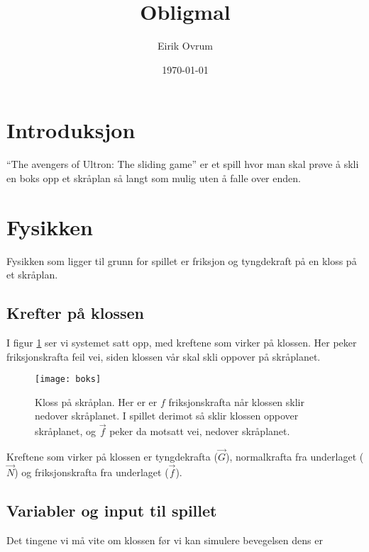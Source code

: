 \documentclass[letterpaper,12pt]{article}
\begin{document}
\title{Obligmal}
\author{Eirik Ovrum}
\date{\today}
\maketitle

\section{Introduksjon}
``The avengers of Ultron: The sliding game'' er et spill hvor man skal prøve å skli en boks opp et skråplan så langt som mulig uten å falle over enden.

\section{Fysikken}
Fysikken som ligger til grunn for spillet er friksjon og tyngdekraft på en kloss på et skråplan. 

\subsection{Krefter på klossen}
I figur \ref{fig:kloss} ser vi systemet satt opp, med kreftene som virker på klossen. Her peker friksjonskrafta feil vei, siden klossen vår skal skli oppover på skråplanet. 



\begin{figure}[ht!] 
  \label{fig:kloss}
  \begin{center}
    \begin{turn}{0} %
        \texttt{[image: boks]} %
    \end{turn}
  \end{center}
  \caption{Kloss på skråplan. Her er er $f$ friksjonskrafta når klossen sklir nedover skråplanet. I spillet derimot så sklir klossen oppover skråplanet, og $\vec f$ peker da motsatt vei, nedover skråplanet.}
\end{figure}

Kreftene som virker på klossen er tyngdekrafta ($\vec G$), normalkrafta fra underlaget ($\vec N$) og friksjonskrafta fra underlaget ($\vec f$).

\subsection{Variabler og input til spillet}
Det tingene vi må vite om klossen før vi kan simulere bevegelsen dens er 
\end{document}
